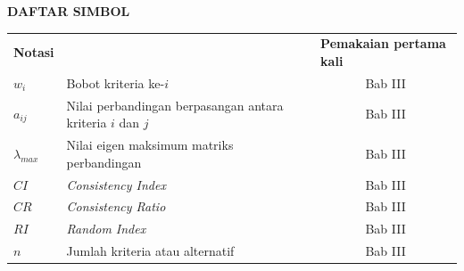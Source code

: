 \cleardoublepage
\vspace{2cm}
\begin{center}
{\fontsize{14}{16.8}\selectfont\textbf{DAFTAR SIMBOL}}\\[1em]
\end{center}
\label{chap:simbol}
\setcounter{chapter}{0}
\setcounter{section}{0}
\vspace{2em}



\begin{longtable}{@{} l >{\raggedright\arraybackslash}p{6.5cm} c @{}}
\multicolumn{1}{l}{\textbf{Notasi}} & \multicolumn{1}{l}{\textbf{Deskripsi}} & \multicolumn{1}{l}{\parbox[c]{3.5cm}{\raggedright \textbf{Pemakaian pertama kali}}} \\

$w_i$           & Bobot kriteria ke-$i$ & Bab III \\
$a_{ij}$        & Nilai perbandingan berpasangan antara kriteria $i$ dan $j$ & Bab III \\
$\lambda_{max}$ & Nilai eigen maksimum matriks perbandingan & Bab III \\
$CI$            & \textit{Consistency Index} & Bab III \\
$CR$            & \textit{Consistency Ratio} & Bab III \\
$RI$            & \textit{Random Index} & Bab III \\
$n$             & Jumlah kriteria atau alternatif & Bab III \\

\end{longtable}
